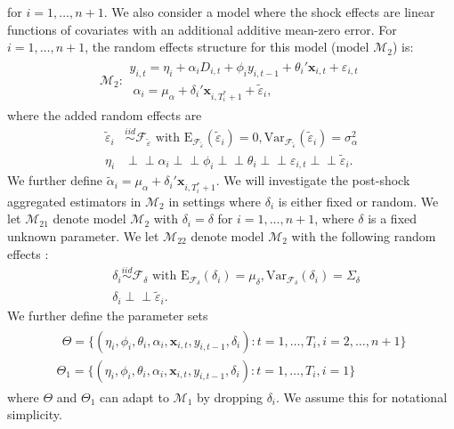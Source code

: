 \documentclass[11pt,3p,review,authoryear]{elsarticle}
\def\mbf#1{\mathbf{#1}} %
\newcommand{\simiid}{\stackrel{iid}{\sim}} %
\newcommand{\indep}{\perp \!\!\! \perp } %
\def\mrm#1{\mathrm{#1}} %
\def\t#1{\tilde{#1}} %
\def\mc#1{\mathcal{#1}} %
\theoremstyle{definition}
\begin{document}
for $i = 1, \ldots, n+1$. We also consider a model where the shock effects are linear functions of covariates with an additional additive mean-zero error. For $i = 1, \ldots, n+1$, the random effects structure for this model (model $\mc{M}_2$) is:
\begin{align}
\mc{M}_2 \colon \begin{array}{l}
  y_{i,t} =\eta_i +\alpha_i D_{i,t} + \phi_i y_{i, t-1} + \theta_i'\mbf{x}_{i,t} + \varepsilon_{i,t}\\[.2cm]
  \; \alpha_i = \mu_{\alpha}+\delta_{i}'\mbf{x}_{i, T_i^*+1}+ \t{\varepsilon}_{i},
\end{array}\label{model2}
\end{align}
 where the added random effects are
\begin{align*}
\t{\varepsilon}_{i} &\simiid  \mc{F}_{\t{\varepsilon}} \text{ with }\mrm{E}_{\mc{F}_{\t{\varepsilon}}}(\t{\varepsilon}_{i})=0, \mrm{Var}_{\mc{F}_{\t{\varepsilon}}}(\t{\varepsilon}_{i})=\sigma^2_{\alpha}\\
\eta_i &\indep  \alpha_i \indep \phi_i \indep \theta_i \indep \varepsilon_{i,t} \indep \t{\varepsilon}_{i}.
\end{align*} 
We further define 
$\tilde{\alpha}_i=\mu_{\alpha}+\delta_i'\mbf{x}_{i, T_i^*+1}$. 
We will investigate the post-shock aggregated estimators in $\mc{M}_2$ 
in settings where $\delta_i$ is either fixed or random. 
We let $\mc{M}_{21}$ denote model $\mc{M}_{2}$ with $\delta_i = \delta$ for $i= 1, \ldots, n+1$, 
where $\delta$ is a  fixed unknown parameter.
We let $\mc{M}_{22}$ denote model $\mc{M}_{2}$ with the following random effects :
\begin{align*}
&\delta_i\simiid  \mc{F}_{\delta} \text{ with }\mrm{E}_{\mc{F}_{\delta}}(\delta_i)=\mu_{\delta}, \mrm{Var}_{\mc{F}_{\delta}}(\delta_i)=\Sigma_\delta \\
   & \delta_i  \indep \t{\varepsilon}_{i}.
\end{align*}
We further define the parameter sets
\begin{align}
\begin{array}{l}
 \;\, \Theta = \{(\eta_i, \phi_i, \theta_i, \alpha_i, \mbf{x}_{i,t}, y_{i,t-1}, \delta_i)\colon    t= 1, \ldots, T_i, i = 2, \ldots, n +1\} \\
   \Theta_1 = \{(\eta_i, \phi_i, \theta_i, \alpha_i, \mbf{x}_{i,t}, y_{i,t-1}, \delta_i)\colon  t= 1, \ldots, T_i, i = 1\}
\end{array}\label{parameter} 
\end{align}
where $\Theta$ and $\Theta_1$ can adapt to $\mc{M}_1$ by dropping $\delta_i$. We assume this for notational simplicity.
\end{document}
